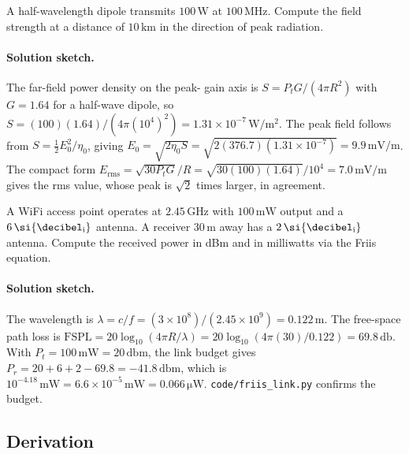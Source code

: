 \begin{exercise}
A half-wavelength dipole transmits $100\,\si{\watt}$ at $100\,\si{
\mega\hertz}$. Compute the field strength at a distance of $10\,\si{
\kilo\meter}$ in the direction of peak radiation.
\paragraph{Solution sketch.} The far-field power density on the peak-
gain axis is $S = P_{t}G/(4\pi R^{2})$ with $G = 1.64$ for a half-wave
dipole, so $S = (100)(1.64)/(4\pi(10^{4})^{2}) = 1.31\times 10^{-7}\,
\si{\watt\per\meter\squared}$. The peak field follows from $S =
\tfrac{1}{2}E_{0}^{2}/\eta_{0}$, giving $E_{0} = \sqrt{2\eta_{0}S} =
\sqrt{2(376.7)(1.31\times 10^{-7})} = 9.9\,\si{\milli\volt\per\meter}$.
The compact form $E_{\text{rms}} = \sqrt{30 P_{t} G}/R = \sqrt{30(100)
(1.64)}/10^{4} = 7.0\,\si{\milli\volt\per\meter}$ gives the rms value,
whose peak is $\sqrt{2}$ times larger, in agreement.
\end{exercise}

\begin{exercise}
A WiFi access point operates at $2.45\,\si{\giga\hertz}$ with $100\,\si{
\milli\watt}$ output and a $6\,\si{\decibel\textsubscript{i}}$
antenna. A receiver $30\,\si{\meter}$ away has a $2\,\si{\decibel
\textsubscript{i}}$ antenna. Compute the received power in dBm and
in milliwatts via the Friis equation.
\paragraph{Solution sketch.} The wavelength is $\lambda = c/f = (3\times
10^{8})/(2.45\times 10^{9}) = 0.122\,\si{\meter}$. The free-space path
loss is $\text{FSPL} = 20\log_{10}(4\pi R/\lambda) = 20\log_{10}(4\pi
(30)/0.122) = 69.8\,\si{\decibel}$. With $P_{t} = 100\,\si{\milli\watt}
= 20\,\si{\decibel}\text{m}$, the link budget gives $P_{r} = 20 + 6 + 2
- 69.8 = -41.8\,\si{\decibel}\text{m}$, which is $10^{-4.18}\,\si{\milli
\watt} = 6.6\times 10^{-5}\,\si{\milli\watt} = 0.066\,\si{\micro\watt}$.
\texttt{code/friis\_link.py} confirms the budget.
\end{exercise}

\subsection*{Derivation}

